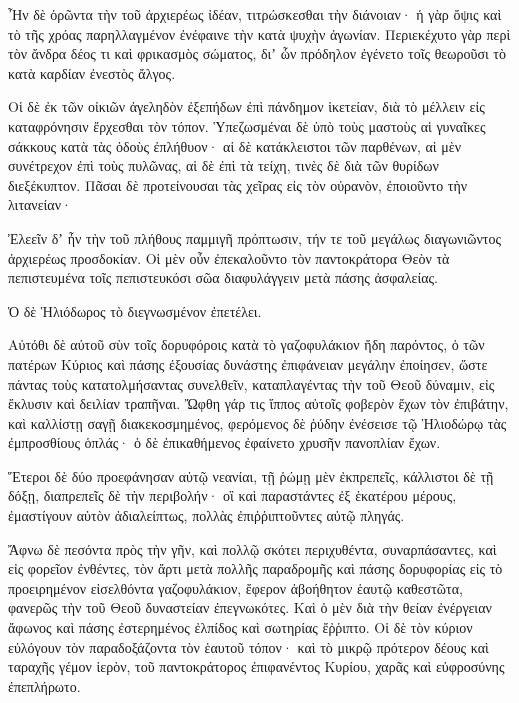 {\par }{\PP {}Ἦν δὲ ὁρῶντα τὴν τοῦ ἀρχιερέως ἰδέαν, τιτρώσκεσθαι τὴν διάνοιαν· ἡ γὰρ ὄψις καὶ τὸ τῆς χρόας παρηλλαγμένον ἐνέφαινε τὴν κατὰ ψυχὴν ἀγωνίαν.
Περιεκέχυτο γὰρ περὶ τὸν ἄνδρα δέος τι καὶ φρικασμὸς σώματος, διʼ ὧν πρόδηλον ἐγένετο τοῖς θεωροῦσι τὸ κατὰ καρδίαν ἐνεστὸς ἄλγος.
\par }{\PP {}Οἱ δὲ ἐκ τῶν οἰκιῶν ἀγεληδὸν ἐξεπήδων ἐπὶ πάνδημον ἱκετείαν, διὰ τὸ μέλλειν εἰς καταφρόνησιν ἔρχεσθαι τὸν τόπον.
Ὑπεζωσμέναι δὲ ὑπὸ τοὺς μαστοὺς αἱ γυναῖκες σάκκους κατὰ τὰς ὁδοὺς ἐπλήθυον· αἱ δὲ κατάκλειστοι τῶν παρθένων, αἱ μὲν συνέτρεχον ἐπὶ τοὺς πυλῶνας, αἱ δὲ ἐπὶ τὰ τείχη, τινὲς δὲ διὰ τῶν θυρίδων διεξέκυπτον.
Πᾶσαι δὲ προτείνουσαι τὰς χεῖρας εἰς τὸν οὐρανὸν, ἐποιοῦντο τὴν λιτανείαν·
\par }{\PP {}Ἐλεεῖν δʼ ἦν τὴν τοῦ πλήθους παμμιγῆ πρόπτωσιν, τήν τε τοῦ μεγάλως διαγωνιῶντος ἀρχιερέως προσδοκίαν.
Οἱ μὲν οὖν ἐπεκαλοῦντο τὸν παντοκράτορα Θεὸν τὰ πεπιστευμένα τοῖς πεπιστευκόσι σῶα διαφυλάγγειν μετὰ πάσης ἀσφαλείας.
\par }{\PP {}Ὁ δὲ Ἡλιόδωρος τὸ διεγνωσμένον ἐπετέλει.
\par }{\PP {}Αὐτόθι δὲ αὐτοῦ σὺν τοῖς δορυφόροις κατὰ τὸ γαζοφυλάκιον ἤδη παρόντος, ὁ τῶν πατέρων Κύριος καὶ πάσης ἐξουσίας δυνάστης ἐπιφάνειαν μεγάλην ἐποίησεν, ὥστε πάντας τοὺς κατατολμήσαντας συνελθεῖν, καταπλαγέντας τὴν τοῦ Θεοῦ δύναμιν, εἰς ἔκλυσιν καὶ δειλίαν τραπῆναι.
Ὤφθη γάρ τις ἵππος αὐτοῖς φοβερὸν ἔχων τὸν ἐπιβάτην, καὶ καλλίστῃ σαγῇ διακεκοσμημένος, φερόμενος δὲ ῥύδην ἐνέσεισε τῷ Ἡλιοδώρῳ τὰς ἐμπροσθίους ὁπλάς· ὁ δὲ ἐπικαθήμενος ἐφαίνετο χρυσῆν πανοπλίαν ἔχων.
\par }{\PP {}Ἕτεροι δὲ δύο προεφάνησαν αὐτῷ νεανίαι, τῇ ῥώμῃ μὲν ἐκπρεπεῖς, κάλλιστοι δὲ τῇ δόξῃ, διαπρεπεῖς δὲ τὴν περιβολήν· οἳ καὶ παραστάντες ἐξ ἑκατέρου μέρους, ἐμαστίγουν αὐτὸν ἀδιαλείπτως, πολλὰς ἐπιῤῥιπτοῦντες αὐτῷ πληγάς.
\par }{\PP {}Ἄφνω δὲ πεσόντα πρὸς τὴν γῆν, καὶ πολλῷ σκότει περιχυθέντα, συναρπάσαντες, καὶ εἰς φορεῖον ἐνθέντες,
τὸν ἄρτι μετὰ πολλῆς παραδρομῆς καὶ πάσης δορυφορίας εἰς τὸ προειρημένον εἰσελθόντα γαζοφυλάκιον, ἔφερον ἀβοήθητον ἑαυτῷ καθεστῶτα, φανερῶς τὴν τοῦ Θεοῦ δυναστείαν ἐπεγνωκότες.
Καὶ ὁ μὲν διὰ τὴν θείαν ἐνέργειαν ἄφωνος καὶ πάσης ἐστερημένος ἐλπίδος καὶ σωτηρίας ἔῤῥιπτο.
Οἱ δὲ τὸν κύριον εὐλόγουν τὸν παραδοξάζοντα τὸν ἑαυτοῦ τόπον· καὶ τὸ μικρῷ πρότερον δέους καὶ ταραχῆς γέμον ἱερὸν, τοῦ παντοκράτορος ἐπιφανέντος Κυρίου, χαρᾶς καὶ εὐφροσύνης ἐπεπλήρωτο.
}
